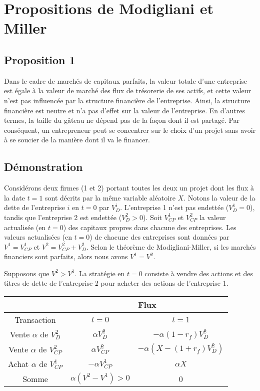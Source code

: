 \documentclass[a4paper, 12pt]{report}
\begin{document}
\section{Propositions de Modigliani et Miller}

\subsection{Proposition 1}

Dans le cadre de marchés de capitaux parfaits, la valeur totale d'une entreprise est égale à la valeur de marché des flux de trésorerie de ses actifs, et cette valeur n'est pas influencée par la structure financière de l'entreprise. Ainsi, la structure financière est neutre et n'a pas d'effet sur la valeur de l'entreprise. En d'autres termes, la taille du gâteau ne dépend pas de la façon dont il est partagé. Par conséquent, un entrepreneur peut se concentrer sur le choix d'un projet sans avoir à se soucier de la manière dont il va le financer.

\subsection{Démonstration}

Considérons deux firmes (1 et 2) portant toutes les deux un projet dont les flux à la date \( t = 1 \) sont décrits par la même variable aléatoire \( X \). Notons la valeur de la dette de l'entreprise \( i \) en \( t = 0 \) par \( V_D^i \). L'entreprise 1 n'est pas endettée (\( V_D^1 = 0 \)), tandis que l'entreprise 2 est endettée (\( V_D^2 > 0 \)). Soit \( V_{CP}^1 \) et \( V_{CP}^2 \) la valeur actualisée (en \( t = 0 \)) des capitaux propres dans chacune des entreprises. Les valeurs actualisées (en \( t = 0 \)) de chacune des entreprises sont données par \( V^1 = V_{CP}^1 \) et \( V^2 = V_{CP}^2 + V_D^2 \). Selon le théorème de Modigliani-Miller, si les marchés financiers sont parfaits, alors nous avons \( V^1 = V^2 \).

Supposons que \( V^2 > V^1 \). La stratégie en \( t = 0 \) consiste à vendre des actions et des titres de dette de l'entreprise 2 pour acheter des actions de l'entreprise 1.

\begin{center}
	\begin{tabular}{@{}ccc@{}}
		\toprule
		& \multicolumn{2}{c}{Flux}                       \\ \midrule
		Transaction                  & $t=0$               & $t=1$                    \\
		Vente $\alpha$ de $V_D^2$    & $\alpha V_D^2$      & $-\alpha(1-r_f)V_D^2$    \\
		Vente $\alpha$ de $V_{CP}^2$ & $\alpha  V_{CP}^2$  & $-\alpha(X-(1+r_f)V_D^2)$ \\
		Achat $\alpha$ de $V_{CP}^1$ & $-\alpha V_{CP}^1$  & $\alpha X$               \\
		Somme                        & $\alpha(V^2-V^1)>0$ & 0                        \\ \bottomrule
	\end{tabular}
\end{center}
\end{document}
